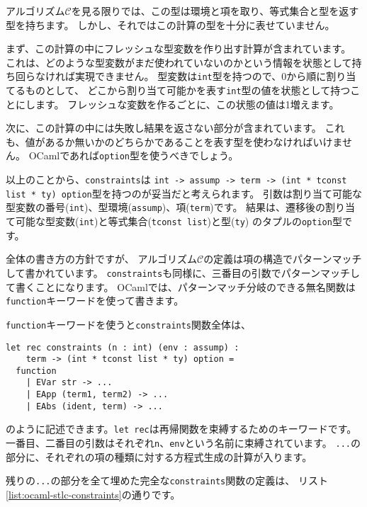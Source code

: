 アルゴリズム$\mathcal C$を見る限りでは、この型は環境と項を取り、等式集合と型を返す型を持ちます。
しかし、それではこの計算の型を十分に表せていません。

まず、この計算の中にフレッシュな型変数を作り出す計算が含まれています。
これは、どのような型変数がまだ使われていないのかという情報を状態として持ち回らなければ実現できません。
型変数は\texttt{int}型を持つので、0から順に割り当てるものとして、
どこから割り当て可能かを表す\texttt{int}型の値を状態として持つことにします。
フレッシュな変数を作るごとに、この状態の値は1増えます。

次に、この計算の中には失敗し結果を返さない部分が含まれています。
これも、値があるか無いかのどちらかであることを表す型を使わなければいけません。
OCamlであれば\texttt{option}型を使うべきでしょう。

以上のことから、\texttt{constraints}は
\texttt{int -> assump -> term -> (int * tconst list * ty) option}型を持つのが妥当だと考えられます。
引数は割り当て可能な型変数の番号(\texttt{int})、型環境(\texttt{assump})、項(\texttt{term})です。
結果は、遷移後の割り当て可能な型変数(\texttt{int})と等式集合(\texttt{tconst list})と型(\texttt{ty})
のタプルの\texttt{option}型です。

全体の書き方の方針ですが、
アルゴリズム$\mathcal C$の定義は項の構造でパターンマッチして書かれています。
\texttt{constraints}も同様に、三番目の引数でパターンマッチして書くことになります。
OCamlでは、パターンマッチ分岐のできる無名関数は\texttt{function}キーワードを使って書きます。

\texttt{function}キーワードを使うと\texttt{constraints}関数全体は、
\begin{lstlisting}
let rec constraints (n : int) (env : assump) :
    term -> (int * tconst list * ty) option =
  function
    | EVar str -> ...
    | EApp (term1, term2) -> ...
    | EAbs (ident, term) -> ...
\end{lstlisting}
のように記述できます。\texttt{let rec}は再帰関数を束縛するためのキーワードです。
一番目、二番目の引数はそれぞれ\texttt{n}、\texttt{env}という名前に束縛されています。
\texttt{...}の部分に、それぞれの項の種類に対する方程式生成の計算が入ります。

残りの\texttt{...}の部分を全て埋めた完全な\texttt{constraints}関数の定義は、
リスト\ref{list:ocaml-stlc-constraints}の通りです。

